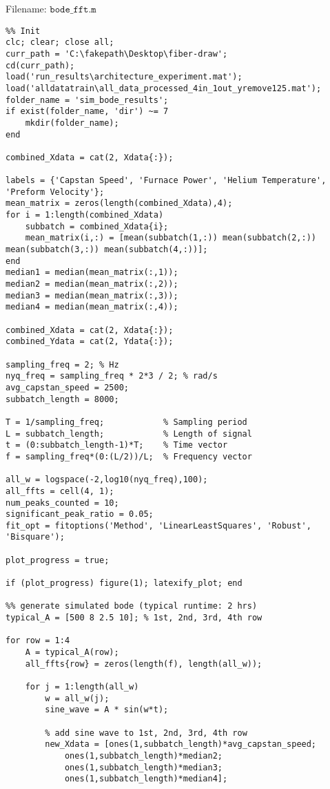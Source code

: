 Filename: $\texttt{bode\_fft.m}$

\begin{lstlisting}
%% Init
clc; clear; close all;
curr_path = 'C:\fakepath\Desktop\fiber-draw';
cd(curr_path);
load('run_results\architecture_experiment.mat');
load('alldatatrain\all_data_processed_4in_1out_yremove125.mat');
folder_name = 'sim_bode_results';
if exist(folder_name, 'dir') ~= 7
    mkdir(folder_name);
end

combined_Xdata = cat(2, Xdata{:});

labels = {'Capstan Speed', 'Furnace Power', 'Helium Temperature', 'Preform Velocity'};
mean_matrix = zeros(length(combined_Xdata),4);
for i = 1:length(combined_Xdata)
    subbatch = combined_Xdata{i};
    mean_matrix(i,:) = [mean(subbatch(1,:)) mean(subbatch(2,:)) mean(subbatch(3,:)) mean(subbatch(4,:))];
end
median1 = median(mean_matrix(:,1));
median2 = median(mean_matrix(:,2));
median3 = median(mean_matrix(:,3));
median4 = median(mean_matrix(:,4));

combined_Xdata = cat(2, Xdata{:});
combined_Ydata = cat(2, Ydata{:});

sampling_freq = 2; % Hz
nyq_freq = sampling_freq * 2*3 / 2; % rad/s
avg_capstan_speed = 2500;
subbatch_length = 8000;

T = 1/sampling_freq;            % Sampling period
L = subbatch_length;            % Length of signal
t = (0:subbatch_length-1)*T;    % Time vector
f = sampling_freq*(0:(L/2))/L;  % Frequency vector

all_w = logspace(-2,log10(nyq_freq),100);
all_ffts = cell(4, 1);
num_peaks_counted = 10;
significant_peak_ratio = 0.05;
fit_opt = fitoptions('Method', 'LinearLeastSquares', 'Robust', 'Bisquare');

plot_progress = true;

if (plot_progress) figure(1); latexify_plot; end

%% generate simulated bode (typical runtime: 2 hrs)
typical_A = [500 8 2.5 10]; % 1st, 2nd, 3rd, 4th row

for row = 1:4
    A = typical_A(row);
    all_ffts{row} = zeros(length(f), length(all_w));

    for j = 1:length(all_w)
        w = all_w(j);
        sine_wave = A * sin(w*t);

        % add sine wave to 1st, 2nd, 3rd, 4th row
        new_Xdata = [ones(1,subbatch_length)*avg_capstan_speed;
            ones(1,subbatch_length)*median2;
            ones(1,subbatch_length)*median3;
            ones(1,subbatch_length)*median4];


\end{lstlisting}
